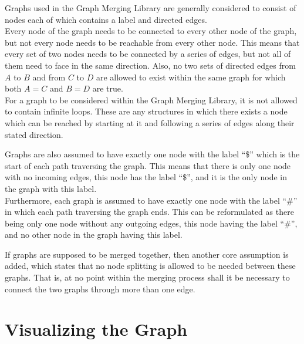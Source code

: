 \documentclass[a4paper,12pt,twoside,BCOR=10mm]{scrbook}
\begin{document}
Graphs used in the Graph Merging Library are generally considered to consist of nodes 
each of which contains a label and directed edges. \\
Every node of the graph needs to be connected to every other node of the graph, 
but not every node needs to be reachable from every other node. This means that every 
set of two nodes needs to be connected by a series of edges, but not all of them need to face in the same direction. 
Also, no two sets of directed edges from $ A $ to $ B $ and from $ C $ to $ D $ are allowed to 
exist within the same graph for which both $ A = C $ and $ B = D $ are true. \\
For a graph to be considered within the Graph Merging Library, 
it is not allowed to contain infinite loops. These are any structures in which 
there exists a node which can be reached by starting at it and following a series 
of edges along their stated direction.


Graphs are also assumed to have exactly one node with the label “\$” which 
is the start of each path traversing the graph. This means that there is only one node with no incoming 
edges, this node has the label “\$”, and it is the only node in the graph with this label. \\
Furthermore, each graph is assumed to have exactly one node with the label “\#” in which 
each path traversing the graph ends. This can be reformulated as there being only one node without any 
outgoing edges, this node having the label “\#”, and no other node in the graph having this label.

If graphs are supposed to be merged together, then another core assumption is added, 
which states that no node splitting is allowed to be needed between these graphs. 
That is, at no point within the merging process shall it be necessary to 
connect the two graphs through more than one edge.


\section{Visualizing the Graph}
%
\end{document}
